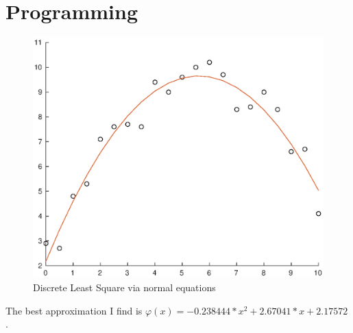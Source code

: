 \documentclass[twoside,a4paper]{article}
\begin{document}
\section*{Programming}
\begin{figure}[H]
\includegraphics[width=7in]{DLS.eps}
\caption{Discrete Least Square via normal equations}
\end{figure}
The best approximation I find is $\varphi(x)=-0.238444*x^2+2.67041*x+2.17572$ .
\end{document}
